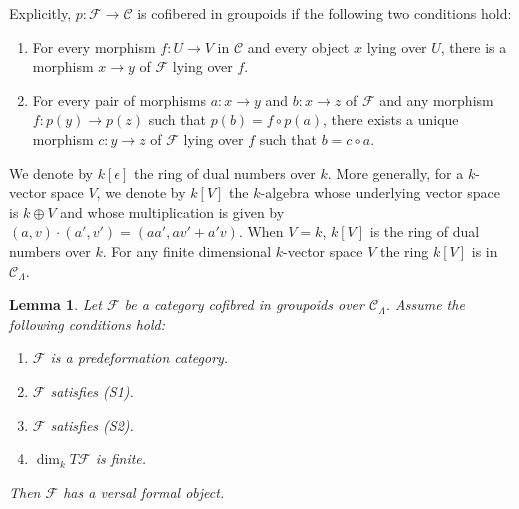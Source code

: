 \documentclass{amsart}
\theoremstyle{plain}
\newtheorem{lemma}[subsection]{Lemma}
\theoremstyle{definition}
\theoremstyle{remark}
\numberwithin{equation}{subsection}
\begin{document}
\noindent
Explicitly, $p: \mathcal{F} \to \mathcal{C}$ is cofibered in groupoids if
the following two conditions hold:
\begin{enumerate}
\item For every morphism $f: U \to V$ in $\mathcal{C}$ and every object
$x$ lying over $U$, there is a morphism $x \to y$ of $\mathcal{F}$ lying
over $f$.
\item For every pair of morphisms $a: x \to y$ and $b: x \to z$
of $\mathcal{F}$ and any morphism $f: p(y) \to p(z)$ such that $p(b) = f
\circ p(a)$, there exists a unique morphism $c: y \to z$ of $\mathcal
F$ lying over $f$ such that $b = c \circ a$.
\end{enumerate}


\medskip\noindent
We denote by $k[\epsilon]$ the ring of dual numbers over $k$.  More
generally, for a $k$-vector space $V$, we denote by $k[V]$ the $k$-algebra
whose underlying vector space is $k \oplus V$ and whose multiplication is given
by $(a, v) \cdot (a', v') = (aa', av' + a'v)$.  When $V = k$, $k[V]$ is the ring
of dual numbers over $k$.  For any finite dimensional $k$-vector space $V$
the ring $k[V]$ is in $\mathcal{C}_\Lambda$.


\begin{lemma}
\label{lemma-versal-object-existence}
Let $\mathcal{F}$ be a category cofibred in groupoids over
$\mathcal{C}_\Lambda$. Assume the following conditions hold:
\begin{enumerate}
\item $\mathcal{F}$ is a predeformation category.
\item $\mathcal{F}$ satisfies (S1).
\item $\mathcal{F}$ satisfies (S2).
\item $\dim_k T\mathcal{F}$ is finite.
\end{enumerate}
Then $\mathcal{F}$ has a versal formal object.
\end{lemma}
\end{document}
